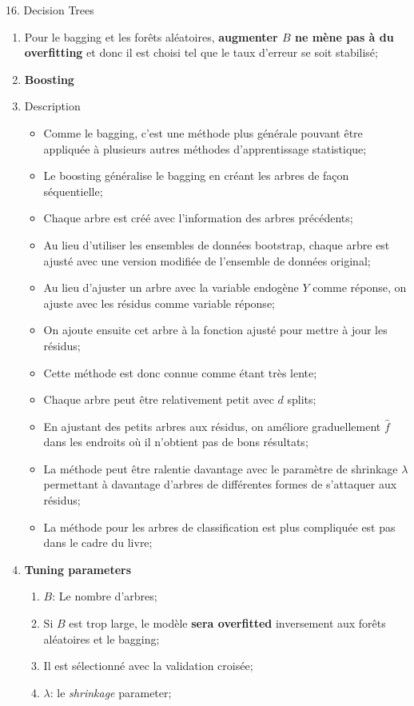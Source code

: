 \documentclass[12pt, titlepage, french]{report}
\begin{document}
\begin{CHPT_SUMM}[label = {DECISION-TREES}]{16. Decision Trees}
\begin{enumerate}
	\item[]	Pour le bagging et les forêts aléatoires, \textbf{augmenter $B$ ne mène pas à du overfitting} et donc il est choisi tel que le taux d'erreur se soit stabilisé;
%		
	\item[]	\textbf{Boosting}
	\item[]	Description
		\begin{itemize}
		\item	Comme le bagging, c'est une méthode plus générale pouvant être appliquée à plusieurs autres méthodes d'apprentissage statistique;
		\item	Le boosting \og généralise \fg{} le bagging en créant les arbres de façon séquentielle;
		\item	Chaque arbre est créé avec l'information des arbres précédents;
		\item	Au lieu d'utiliser les ensembles de données bootstrap, chaque arbre est ajusté avec une version modifiée de l'ensemble de données original;
		\item	Au lieu d'ajuster un arbre avec la variable endogène $Y$ comme réponse, on ajuste avec les résidus comme variable réponse;
		\item[]	On ajoute ensuite cet arbre à la fonction ajusté pour mettre à jour les résidus;
		\item[]	Cette méthode est donc connue comme étant très lente;
		\item	Chaque arbre peut être relativement petit avec $d$ splits;
		\item[]	En ajustant des petits arbres aux résidus, on améliore graduellement $\hat{f}$ dans les endroits où il n'obtient pas de bons résultats;
		\item	La méthode peut être ralentie davantage avec le paramètre de shrinkage $\lambda$ permettant à davantage d'arbres de différentes formes de \og s'attaquer \fg{} aux résidus;
		\item	La méthode pour les arbres de classification est plus compliquée est pas dans le cadre du livre;
		\end{itemize}
	\item[]	\textbf{Tuning parameters}
		\begin{enumerate}
		\item	$B$: Le nombre d'arbres;
		\item[]	Si $B$ est trop large, le modèle \textbf{sera overfitted} inversement aux forêts aléatoires et le bagging;
		\item[]	Il est sélectionné avec la validation croisée;
		\item	$\lambda$: le \textit{shrinkage} parameter;

\end{enumerate}
\end{enumerate}
\end{CHPT_SUMM}
\end{document}
